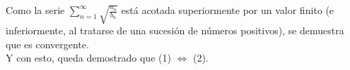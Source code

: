 \documentclass[../../main.tex]{subfiles}
\begin{document}
  Como la serie $\displaystyle\sum_{n = 1}^\infty \sqrt{\frac{a_n}{b_n}}$ está acotada superiormente por un valor finito (e inferiormente, al tratarse de una sucesión de números positivos), se demuestra que es convergente. \\

  Y con esto, queda demostrado que (1) $\iff$ (2).
\end{document}
